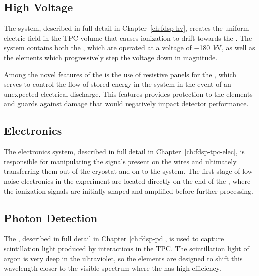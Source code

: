 \subsection{High Voltage}
\label{sec:fdsp-ov-hv}

The  system, described in full detail in Chapter~\ref{ch:fdsp-hv}, creates the uniform electric field in the TPC volume that causes ionization to drift towards the .  The  system contains both the , which are operated at a 
voltage of \SI{-180}{kV}, as well as the  elements which progressively step the  voltage down in magnitude.  

Among the novel features of the \single \lartpc is the use of resistive panels for the , which serves to control the flow of stored energy in the  system in the event of an unexpected electrical discharge.  This features provides protection to the  elements and guards against damage that would negatively impact detector performance.  



\subsection{Electronics}
\label{sec:fdsp-ov-elec}

The electronics system, described in full detail in Chapter~\ref{ch:fdsp-tpc-elec}, is responsible for manipulating the signals present on the  wires and ultimately transferring them out of the cryostat and on to the  system.  The first stage of low-noise electronics in the experiment are located directly on the end of the , where the ionization signals are initially shaped and amplified before further processing. 


\subsection{Photon Detection}
\label{sec:fdsp-ov-pds}

The , described in full detail in Chapter~\ref{ch:fdsp-pd}, is used to capture scintillation light produced by interactions in the TPC.  The scintillation light of argon is very deep in the ultraviolet, so the  elements are designed to shift this wavelength closer to the visible spectrum where the  has high efficiency.  

